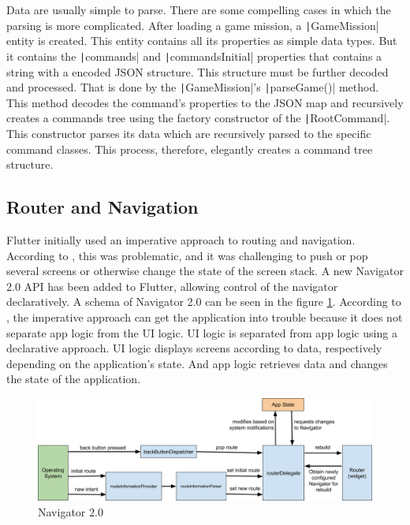 Data are usually simple to parse.
There are some compelling cases in which the parsing is more complicated.
After loading a game mission, a \texttt|GameMission| entity is created.
This entity contains all its properties as simple data types.
But it contains the \texttt|commands| and \texttt|commandsInitial| properties that contains a string with a encoded JSON structure.
This structure must be further decoded and processed.
That is done by the \texttt|GameMission|'s \texttt|parseGame()| method.
This method decodes the command's properties to the JSON map and recursively creates a commands tree using the factory constructor of the \texttt|RootCommand|.
This constructor parses its data which are recursively parsed to the specific command classes.
This process, therefore, elegantly creates a command tree structure.

\subsection{Router and Navigation}

Flutter initially used an imperative approach to routing and navigation.
According to \cite{ryan_2020_navigator}, this was problematic, and it was challenging to push or pop several screens or otherwise change the state of the screen stack.
A new Navigator 2.0 API has been added to Flutter, allowing control of the navigator declaratively.
A schema of Navigator 2.0 can be seen in the figure \ref{fig:navigator}.
According to \cite{kietay_2021_navigator}, the imperative approach can get the application into trouble because it does not separate app logic from the UI logic.
UI logic is separated from app logic using a declarative approach.
UI logic displays screens according to data, respectively depending on the application's state.
And app logic retrieves data and changes the state of the application.

\begin{figure}
    \centering
    \includegraphics[width=1\linewidth]{assets/implementation/navigator.png}
    \caption{Navigator 2.0 \cite{ryan_2020_navigator}}
    \label{fig:navigator}
\end{figure}

